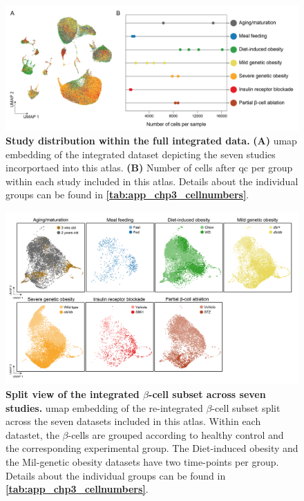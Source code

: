 \begin{figure}[H]
\centering
\includegraphics[width=\linewidth]{Appendix2/Fig/F3-2-v2-02.png}
\caption[Study distribution within the full integrated data]{\textbf{Study distribution within the full integrated data.} \textbf{(A)} \gls{umap} embedding of the integrated dataset depicting the seven studies incorportaed into this atlas. \textbf{(B)} Number of cells after \gls{qc} per group within each study included in this atlas. Details about the individual groups can be found in \textbf{\autoref{tab:app_chp3_cellnumbers}}.}
\label{fig:app_chp3_study}
\end{figure}




\begin{figure}[H]
\centering
\includegraphics[width=\linewidth]{Appendix2/Fig/F3-4-01.png}
\caption[Split view of the integrated $\beta$-cell subset across seven studies]{\textbf{Split view of the integrated $\beta$-cell subset across seven studies.} \gls{umap} embedding of the re-integrated $\beta$-cell subset split across the seven datasets included in this atlas. Within each datastet, the $\beta$-cells are grouped according to healthy control and the corresponding experimental group. The Diet-induced obesity and the Mil-genetic obesity datasets have two time-points per group. Details about the individual groups can be found in \textbf{\autoref{tab:app_chp3_cellnumbers}}.}
\label{fig:app_chp3_betastudy}
\end{figure}


